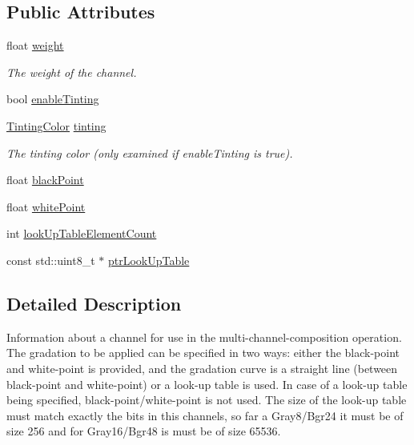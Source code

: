 \subsection*{Public Attributes}
\begin{DoxyCompactItemize}
\item 
\mbox{\label{structlib_c_z_i_1_1_compositors_1_1_channel_info_a2a049e26e597abd995dcf860f45f0d3e}} 
float \hyperlink{structlib_c_z_i_1_1_compositors_1_1_channel_info_a2a049e26e597abd995dcf860f45f0d3e}{weight}
\begin{DoxyCompactList}\small\item\em The weight of the channel. \end{DoxyCompactList}\item 
bool \hyperlink{structlib_c_z_i_1_1_compositors_1_1_channel_info_a55842ad5f759439b4e7909b19a3e10ad}{enable\+Tinting}
\item 
\mbox{\label{structlib_c_z_i_1_1_compositors_1_1_channel_info_a5bc342e6d105188d423110cbbd48af87}} 
\hyperlink{structlib_c_z_i_1_1_compositors_1_1_tinting_color}{Tinting\+Color} \hyperlink{structlib_c_z_i_1_1_compositors_1_1_channel_info_a5bc342e6d105188d423110cbbd48af87}{tinting}
\begin{DoxyCompactList}\small\item\em The tinting color (only examined if enable\+Tinting is true). \end{DoxyCompactList}\item 
float \hyperlink{structlib_c_z_i_1_1_compositors_1_1_channel_info_a108977b9e981ecff39b65add4bceddb2}{black\+Point}
\item 
float \hyperlink{structlib_c_z_i_1_1_compositors_1_1_channel_info_acd5158e2c9011e0d5af98363c89d6a96}{white\+Point}
\item 
int \hyperlink{structlib_c_z_i_1_1_compositors_1_1_channel_info_a2d347a638359b163913fe14205725a55}{look\+Up\+Table\+Element\+Count}
\item 
const std\+::uint8\+\_\+t $\ast$ \hyperlink{structlib_c_z_i_1_1_compositors_1_1_channel_info_aced547bcca881f7101bcba53b113fe15}{ptr\+Look\+Up\+Table}
\end{DoxyCompactItemize}


\subsection{Detailed Description}
Information about a channel for use in the multi-\/channel-\/composition operation. The gradation to be applied can be specified in two ways\+: either the black-\/point and white-\/point is provided, and the gradation curve is a straight line (between black-\/point and white-\/point) or a look-\/up table is used. In case of a look-\/up table being specified, black-\/point/white-\/point is not used. The size of the look-\/up table must match exactly the bits in this channels, so far a Gray8/\+Bgr24 it must be of size 256 and for Gray16/\+Bgr48 is must be of size 65536. 

